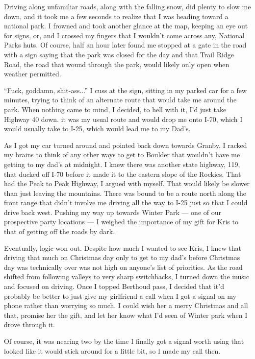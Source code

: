 Driving along unfamiliar roads, along with the falling snow, did plenty to slow me down, and it took me a few seconds to realize that I was heading toward a national park.  I frowned and took another glance at the map, keeping an eye out for signs, or, and I crossed my fingers that I wouldn't come across any, National Parks huts.  Of course, half an hour later found me stopped at a gate in the road with a sign saying that the park was closed for the day and that Trail Ridge Road, the road that wound through the park, would likely only open when weather permitted.

``Fuck, goddamn, shit-ass...'' I cuss at the sign, sitting in my parked car for a few minutes, trying to think of an alternate route that would take me around the park.  When nothing came to mind, I decided, to hell with it, I'd just take Highway 40 down.  it was my usual route and would drop me onto I-70, which I would usually take to I-25, which would lead me to my Dad's.

As I got my car turned around and pointed back down towards Granby, I racked my brains to think of any other ways to get to Boulder that wouldn't have me getting to my dad's at midnight.  I knew there was another state highway, 119, that ducked off I-70 before it made it to the eastern slope of the Rockies.  That had the Peak to Peak Highway, I argued with myself.  That would likely be slower than just leaving the mountains.  There was bound to be a route north along the front range that didn't involve me driving all the way to I-25 just so that I could drive back west.  Pushing my way up towards Winter Park --- one of our prospective party locations --- I weighed the importance of my gift for Kris to that of getting off the roads by dark.

Eventually, logic won out.  Despite how much I wanted to see Kris, I knew that driving that much on Christmas day only to get to my dad's before Christmas day was technically over was not high on anyone's list of priorities.  As the road shifted from following valleys to very sharp switchbacks, I turned down the music and focused on driving.  Once I topped Berthoud pass, I decided that it'd probably be better to just give my girlfriend a call when I got a signal on my phone rather than worrying so much. I could wish her a merry Christmas and all that, promise her the gift, and let her know what I'd seen of Winter park when I drove through it.

Of course, it was nearing two by the time I finally got a signal worth using that looked like it would stick around for a little bit, so I made my call then.

